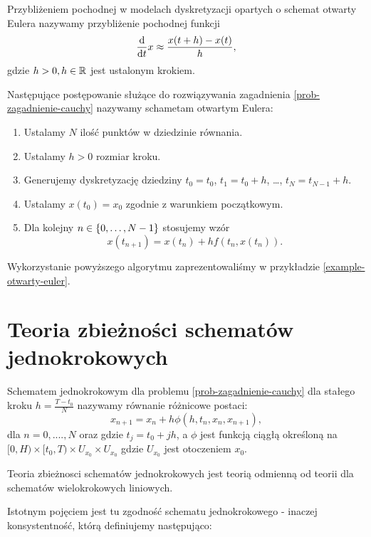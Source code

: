 \documentclass[12pt,a4paper]{report}
\begin{document}
\begin{example} 
\begin{definition}
Przybliżeniem pochodnej w modelach dyskretyzacji opartych o schemat otwarty Eulera nazywamy przybliżenie pochodnej funkcji
$$
\frac{\mathrm{d} {} }{\mathrm{d}{t}}x \approx \frac{x(t+h) - x(t)}{h},
$$
gdzie $h >0, h \in \mathbb{R} $ jest ustalonym krokiem. 
\end{definition}

\begin{algorithm}
Następujące postępowanie służące do rozwiązywania zagadnienia \ref{prob-zagadnienie-cauchy} nazywamy schametam otwartym Eulera:
\begin{enumerate}
\item Ustalamy $N$ ilość punktów w dziedzinie równania. 
\item Ustalamy $h>0$ rozmiar kroku.
\item Generujemy dyskretyzację dziedziny $t_0 = t_0$, $t_1 = t_0 + h$, \ldots, $t_N = t_{N-1}+h$. 
\item Ustalamy $x(t_0) = x_0$ zgodnie z warunkiem początkowym.
\item Dla kolejny $n \in \left\lbrace {0, \ldots, N-1} \right\rbrace$ stosujemy wzór
$$
x(t_{n+1}) = x(t_n) + h f(t_n, x(t_n)).
$$
\end{enumerate}
\end{algorithm}

Wykorzystanie powyższego algorytmu zaprezentowaliśmy w przykładzie \ref{example-otwarty-euler}.

\section{Teoria zbieżności schematów jednokrokowych}

\begin{definition}
Schematem jednokrokowym dla problemu \ref{prob-zagadnienie-cauchy} dla stałego kroku $h = \frac{T-t_0}{N}$ nazywamy równanie różnicowe postaci:
$$
x_{n+1} = x_n + h \phi(h,t_{n},x_{n},x_{n+1}),  
$$
dla $n = 0,....,N$ oraz gdzie $t_{j} = t_{0} + jh$, a $\phi$ jest funkcją ciągłą określoną na $[0,H) \times [t_0,T) \times U_{x_0} \times U_{x_0} $ gdzie $ U_{x_0} $ jest otoczeniem $x_0$.   
\end{definition}


Teoria zbieżnosci schematów jednokrokowych jest teorią odmienną od teorii dla schematów wielokrokowych liniowych. 

Istotnym pojęciem jest tu zgodność schematu jednokrokowego - inaczej konsystentność, którą definiujemy następująco: 


\end{example}
\end{document}
